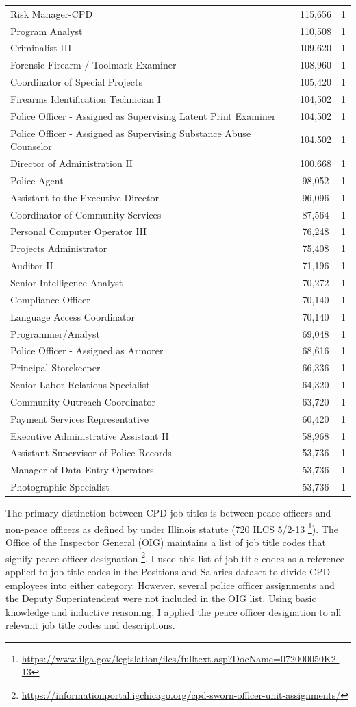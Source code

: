 \documentclass[
]{article}
\begin{document}
\begin{longtable}[]{@{}lcc@{}}
Risk Manager-CPD & 115,656 & 1\tabularnewline
Program Analyst & 110,508 & 1\tabularnewline
Criminalist III & 109,620 & 1\tabularnewline
Forensic Firearm / Toolmark Examiner & 108,960 & 1\tabularnewline
Coordinator of Special Projects & 105,420 & 1\tabularnewline
Firearms Identification Technician I & 104,502 & 1\tabularnewline
Police Officer - Assigned as Supervising Latent Print Examiner & 104,502
& 1\tabularnewline
Police Officer - Assigned as Supervising Substance Abuse Counselor &
104,502 & 1\tabularnewline
Director of Administration II & 100,668 & 1\tabularnewline
Police Agent & 98,052 & 1\tabularnewline
Assistant to the Executive Director & 96,096 & 1\tabularnewline
Coordinator of Community Services & 87,564 & 1\tabularnewline
Personal Computer Operator III & 76,248 & 1\tabularnewline
Projects Administrator & 75,408 & 1\tabularnewline
Auditor II & 71,196 & 1\tabularnewline
Senior Intelligence Analyst & 70,272 & 1\tabularnewline
Compliance Officer & 70,140 & 1\tabularnewline
Language Access Coordinator & 70,140 & 1\tabularnewline
Programmer/Analyst & 69,048 & 1\tabularnewline
Police Officer - Assigned as Armorer & 68,616 & 1\tabularnewline
Principal Storekeeper & 66,336 & 1\tabularnewline
Senior Labor Relations Specialist & 64,320 & 1\tabularnewline
Community Outreach Coordinator & 63,720 & 1\tabularnewline
Payment Services Representative & 60,420 & 1\tabularnewline
Executive Administrative Assistant II & 58,968 & 1\tabularnewline
Assistant Supervisor of Police Records & 53,736 & 1\tabularnewline
Manager of Data Entry Operators & 53,736 & 1\tabularnewline
Photographic Specialist & 53,736 & 1\tabularnewline
\bottomrule
\end{longtable}

The primary distinction between CPD job titles is between peace officers
and non-peace officers as defined by under Illinois statute (720 ILCS
5/2-13 \footnote{\url{https://www.ilga.gov/legislation/ilcs/fulltext.asp?DocName=072000050K2-13}}).
The Office of the Inspector General (OIG) maintains a list of job title
codes that signify peace officer designation \footnote{\url{https://informationportal.igchicago.org/cpd-sworn-officer-unit-assignments/}}.
I used this list of job title codes as a reference applied to job title
codes in the Positions and Salaries dataset to divide CPD employees into
either category. However, several police officer assignments and the
Deputy Superintendent were not included in the OIG list. Using basic
knowledge and inductive reasoning, I applied the peace officer
designation to all relevant job title codes and descriptions.
\end{document}
